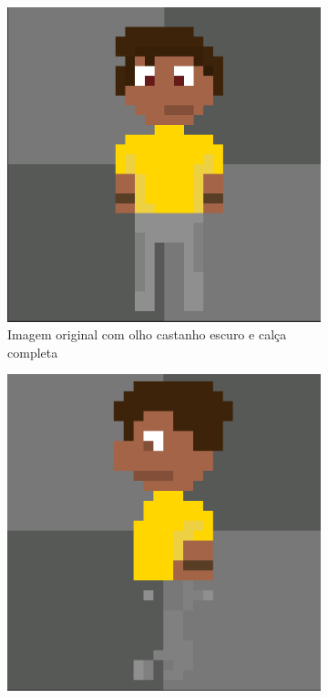 \begin{figure}[htbp]
    \centering
    \caption{\small Comparação de cores entre o sprite original e o resultado gerado no Pixel Lab}
    \label{fig:pixelLabRotComparaCor}
    \begin{subfigure}{0.45\linewidth}
        \centering
        \includegraphics[width=1\linewidth]{figs/pixelLab/dia2/sprite_centro.PNG}
        \caption{\small Imagem original com olho castanho escuro e calça completa}
        \label{fig:pixelLabRotComparaCorA}
    \end{subfigure}
    \begin{subfigure}{0.45\linewidth}
        \centering
        \includegraphics[width=1\linewidth]{figs/pixelLab/dia2/rot90res2.PNG}

\end{subfigure}
\end{figure}
